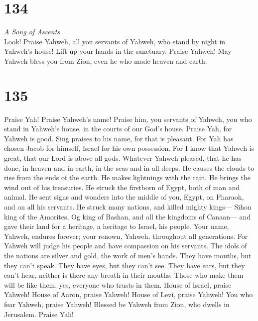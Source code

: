 \hypertarget{section-133}{%
\section{134}\label{section-133}}

\emph{A Song of Ascents.}\\
 Look! Praise Yahweh, all you servants of Yahweh, who
stand by night in Yahweh's house!  Lift up your hands in
the sanctuary. Praise Yahweh!  May Yahweh bless you from
Zion, even he who made heaven and earth.

\hypertarget{section-134}{%
\section{135}\label{section-134}}

 Praise Yah! Praise Yahweh's name! Praise him, you
servants of Yahweh,  you who stand in Yahweh's house, in
the courts of our God's house.  Praise Yah, for Yahweh is
good. Sing praises to his name, for that is pleasant.  For
Yah has chosen Jacob for himself, Israel for his own possession.
 For I know that Yahweh is great, that our Lord is above
all gods.  Whatever Yahweh pleased, that he has done, in
heaven and in earth, in the seas and in all deeps.  He
causes the clouds to rise from the ends of the earth. He makes
lightnings with the rain. He brings the wind out of his treasuries.
 He struck the firstborn of Egypt, both of man and animal.
 He sent signs and wonders into the middle of you, Egypt,
on Pharaoh, and on all his servants.  He struck many
nations, and killed mighty kings---  Sihon king of the
Amorites, Og king of Bashan, and all the kingdoms of Canaan---
 and gave their land for a heritage, a heritage to
Israel, his people.  Your name, Yahweh, endures forever;
your renown, Yahweh, throughout all generations.  For
Yahweh will judge his people and have compassion on his servants.
 The idols of the nations are silver and gold, the work
of men's hands.  They have mouths, but they can't speak.
They have eyes, but they can't see.  They have ears, but
they can't hear, neither is there any breath in their mouths.
 Those who make them will be like them, yes, everyone who
trusts in them.  House of Israel, praise Yahweh! House of
Aaron, praise Yahweh!  House of Levi, praise Yahweh! You
who fear Yahweh, praise Yahweh!  Blessed be Yahweh from
Zion, who dwells in Jerusalem. Praise Yah!

